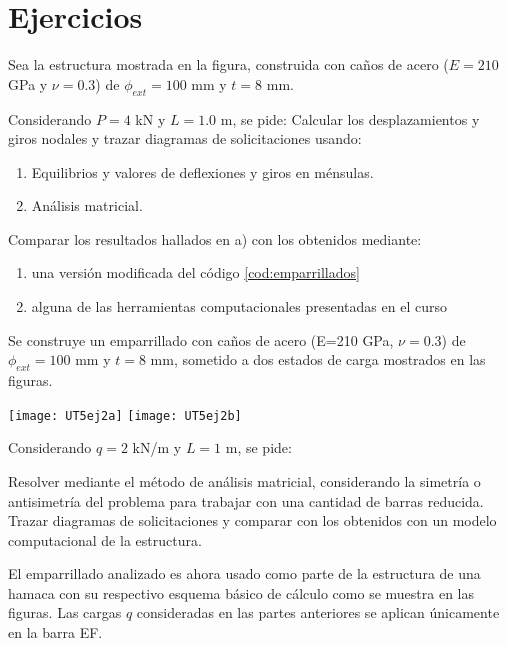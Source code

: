 \section{Ejercicios}

\ejercicio

Sea la estructura mostrada en la figura, construida con caños de acero ($E=210$ GPa y $\nu =0.3$) de $\phi_{ext} = 100$ mm y $t=8$ mm.

\begin{center}
	\def\svgwidth{0.5\textwidth}
	
\end{center}

Considerando $P=4$ kN y $L=1.0$ m, se pide:
%
\parte Calcular los desplazamientos y giros nodales y trazar diagramas de solicitaciones usando:
\begin{enumerate}
\item Equilibrios y valores de deflexiones y giros en ménsulas. 
\item Análisis matricial.
\end{enumerate}
\parte Comparar los resultados hallados en a) con los obtenidos mediante:
  \begin{enumerate}
   \item una versión modificada del código \ref{cod:emparrillados}
  \item alguna de las herramientas computacionales presentadas en el curso
  \end{enumerate}


\ejercicio

Se construye un emparrillado con caños de acero (E=210 GPa, $\nu=0.3$) de $\phi_{ext}=100$ mm y $t=8$ mm, sometido a dos estados de carga mostrados en las figuras.

\begin{center}
	\texttt{[image: UT5ej2a]}
	\hspace{0.1\linewidth}
	\texttt{[image: UT5ej2b]}
\end{center}

Considerando $q=2$ kN/m y $L=1$ m, se pide:

\parte Resolver mediante el método de análisis matricial, considerando la simetría o antisimetría del problema para trabajar con una cantidad de barras reducida.
%
\parte Trazar diagramas de solicitaciones y comparar con los obtenidos con un modelo computacional de la estructura.

\parte El emparrillado analizado es ahora usado como parte de la estructura de una hamaca con su respectivo esquema básico de cálculo como se muestra en las figuras. %
Las cargas $q$ consideradas en las partes anteriores se aplican únicamente en la barra EF.

